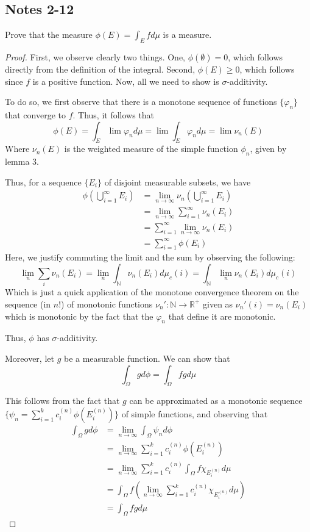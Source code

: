 \documentclass[fontsize=11pt]{scrartcl} %
\numberwithin{equation}{section} %
\numberwithin{figure}{section} %
\numberwithin{table}{section} %
\newcommand{\R}{\mathbb{R}}
\newcommand{\N}{\mathbb{N}}
\begin{document}
\subsection*{Notes 2-12}
Prove that the measure $\phi(E) = \int_E fd\mu$ is a measure.
\\
\begin{proof}
First, we observe clearly two things. One, $\phi(\emptyset) = 0$, which follows directly
from the definition of the integral. Second, $\phi(E)\geq 0$, which follows since $f$ is
a positive function. Now, all we need to show is $\sigma$-additivity.

To do so, we first observe that there is a monotone sequence of functions $\{\varphi_n\}$
that converge to $f$. Thus, it follows that
\[
\phi(E) = \int_E\lim\varphi_n d\mu = \lim\int_E\varphi_nd\mu = \lim \nu_n(E)
\]
Where $\nu_n(E)$ is the weighted measure of the simple function $\phi_n$, given by lemma 3.

Thus, for a sequence $\{E_i\}$ of disjoint measurable subsets, we have
\[
\begin{aligned}
\phi\left(\bigcup_{i=1}^{\infty}E_i\right) &= \lim_{n\to\infty}\nu_n\left(\bigcup_{i=1}^{\infty}E_i\right)\\
                    &= \lim_{n\to\infty} \sum_{i=1}^{\infty}\nu_n(E_i)\\
                    &= \sum_{i=1}^{\infty} \lim_{n\to\infty}\nu_n(E_i)\\
                    &= \sum_{i=1}^{\infty} \phi(E_i)
\end{aligned}
\]
Here, we justify commuting the limit and the sum by observing the following:
\[
\lim_n \sum_i \nu_n(E_i) = \lim_n \int_{\N}\nu_n(E_i)d\mu_c(i) = \int_{\N}\lim_n\nu_n(E_i)d\mu_c(i)
\]
Which is just a quick application of the monotone convergence theorem on the sequence (in $n$!)
of monotonic functions $\nu_n':\N\to\R^+$ given as $\nu_n'(i) = \nu_n(E_i)$ which is monotonic
by the fact that the $\varphi_n$ that define it are monotonic.

Thus, $\phi$ has $\sigma$-additivity.

Moreover, let $g$ be a measurable function. We can show that
\[
\int_{\Omega} gd\phi = \int_{\Omega}fgd\mu
\]

This follows from the fact that $g$ can be approximated as a monotonic sequence $\{\psi_n =\sum_{i=1}^k c^{(n)}_i\phi(E^{(n)}_i)\}$
of simple functions, and observing that
\[
\begin{aligned}
\int_{\Omega} gd\phi    &= \lim_{n\to\infty} \int_{\Omega} \psi_nd\phi\\
                        &= \lim_{n\to\infty} \sum_{i=1}^k c^{(n)}_i\phi(E^{(n)}_i)\\
                        &= \lim_{n\to\infty} \sum_{i=1}^k c^{(n)}_i\int_{\Omega} f\chi_{E_i^{(n)}} d\mu\\
                        &= \int_{\Omega} f\left(\lim_{n\to\infty}\sum_{i=1}^k c^{(n)}_i\chi_{E_i^{(n)}}d\mu\right)\\
                        &= \int_{\Omega} fgd\mu
\end{aligned}
\]
\end{proof}
\end{document}

